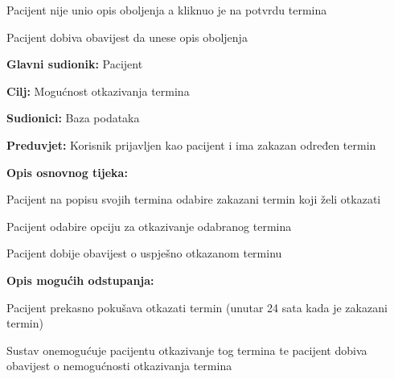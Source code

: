 \begin{packed_item}
\begin{packed_item}
\begin{packed_enum}
		\end{packed_enum}
		
		\item[3.a] Pacijent nije unio opis oboljenja a kliknuo je na potvrdu termina
		\item[] \begin{packed_enum}
			
			\item Pacijent dobiva obavijest da unese opis oboljenja
			
		\end{packed_enum}
		
		
		
	\end{packed_item}
\end{packed_item}

\noindent {}
\begin{packed_item}
	
	\item \textbf{Glavni sudionik: }Pacijent
	\item  \textbf{Cilj:} Mogućnost otkazivanja termina 
	\item  \textbf{Sudionici:} Baza podataka
	\item  \textbf{Preduvjet:} Korisnik prijavljen kao pacijent i ima zakazan određen termin
	\item  \textbf{Opis osnovnog tijeka:}
	
	\item[] \begin{packed_enum}
		
		\item Pacijent na popisu svojih termina odabire zakazani termin koji želi otkazati
		\item Pacijent odabire opciju za otkazivanje odabranog termina
		\item Pacijent dobije obavijest o uspješno otkazanom terminu
	\end{packed_enum}
	
	\item  \textbf{Opis mogućih odstupanja:}
	
	\item[] \begin{packed_item}
		
		\item[2.a] Pacijent prekasno pokušava otkazati termin (unutar 24 sata kada je zakazani termin)
		\item[] \begin{packed_enum}
			
			\item Sustav onemogućuje pacijentu otkazivanje tog termina te pacijent dobiva obavijest o nemogućnosti otkazivanja termina
			
		\end{packed_enum}
		
	\end{packed_item}
\end{packed_item}

